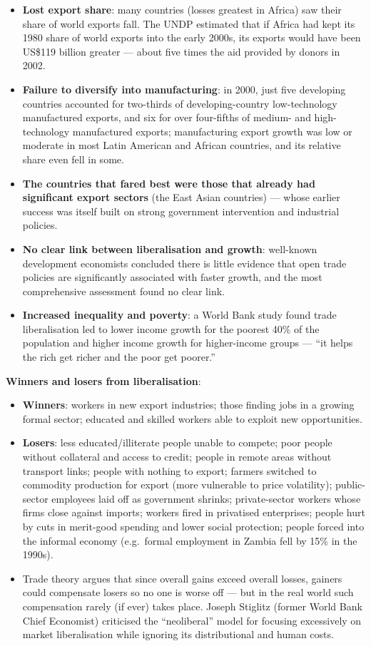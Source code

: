 \begin{itemize}
  \item \textbf{Lost export share}: many countries (losses greatest in Africa) saw their share of world exports fall. The UNDP estimated that if Africa had kept its 1980 share of world exports into the early 2000s, its exports would have been US\$119 billion greater --- about five times the aid provided by donors in 2002.
  \item \textbf{Failure to diversify into manufacturing}: in 2000, just five developing countries accounted for two-thirds of developing-country low-technology manufactured exports, and six for over four-fifths of medium- and high-technology manufactured exports; manufacturing export growth was low or moderate in most Latin American and African countries, and its relative share even fell in some.
  \item \textbf{The countries that fared best were those that already had significant export sectors} (the East Asian countries) --- whose earlier success was itself built on strong government intervention and industrial policies.
  \item \textbf{No clear link between liberalisation and growth}: well-known development economists concluded there is little evidence that open trade policies are significantly associated with faster growth, and the most comprehensive assessment found no clear link.
  \item \textbf{Increased inequality and poverty}: a World Bank study found trade liberalisation led to lower income growth for the poorest 40\% of the population and higher income growth for higher-income groups --- ``it helps the rich get richer and the poor get poorer.''
\end{itemize}
\textbf{Winners and losers from liberalisation}:
\begin{itemize}
  \item \textbf{Winners}: workers in new export industries; those finding jobs in a growing formal sector; educated and skilled workers able to exploit new opportunities.
  \item \textbf{Losers}: less educated/illiterate people unable to compete; poor people without collateral and access to credit; people in remote areas without transport links; people with nothing to export; farmers switched to commodity production for export (more vulnerable to price volatility); public-sector employees laid off as government shrinks; private-sector workers whose firms close against imports; workers fired in privatised enterprises; people hurt by cuts in merit-good spending and lower social protection; people forced into the informal economy (e.g.\ formal employment in Zambia fell by 15\% in the 1990s).
  \item Trade theory argues that since overall gains exceed overall losses, gainers could compensate losers so no one is worse off --- but in the real world such compensation rarely (if ever) takes place. Joseph Stiglitz (former World Bank Chief Economist) criticised the ``neoliberal'' model for focusing excessively on market liberalisation while ignoring its distributional and human costs.
\end{itemize}
